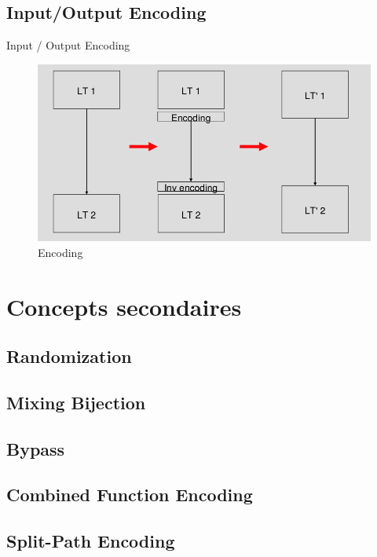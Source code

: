 \documentclass{beamer}
\begin{document}
\subsection{Input/Output Encoding}

\begin{frame}{Input / Output Encoding}
\begin{figure}[h]
\centering
\includegraphics[scale=0.5]{images/encoding.png}
\caption{Encoding}
\label{fig:keygen}
\end{figure}
\end{frame}

\section{Concepts secondaires}

\subsection{Randomization}

\subsection{Mixing Bijection}

\subsection{Bypass}

\subsection{Combined Function Encoding}

\subsection{Split-Path Encoding}
\end{document}
